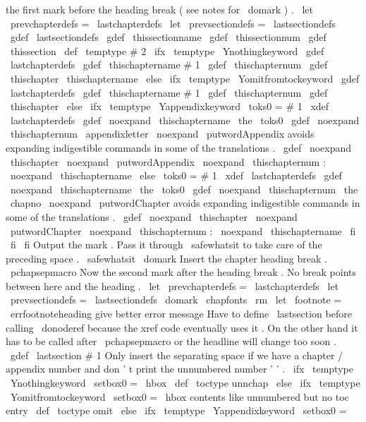 {{{{the
first
mark
before
the
heading
break
(
see
notes
for
\
domark
)
.
\
let
\
prevchapterdefs
=
\
lastchapterdefs
\
let
\
prevsectiondefs
=
\
lastsectiondefs
\
gdef
\
lastsectiondefs
{
\
gdef
\
thissectionname
{
}
\
gdef
\
thissectionnum
{
}
%
\
gdef
\
thissection
{
}
}
%
%
\
def
\
temptype
{
#
2
}
%
\
ifx
\
temptype
\
Ynothingkeyword
\
gdef
\
lastchapterdefs
{
\
gdef
\
thischaptername
{
#
1
}
\
gdef
\
thischapternum
{
}
%
\
gdef
\
thischapter
{
\
thischaptername
}
}
%
\
else
\
ifx
\
temptype
\
Yomitfromtockeyword
\
gdef
\
lastchapterdefs
{
\
gdef
\
thischaptername
{
#
1
}
\
gdef
\
thischapternum
{
}
%
\
gdef
\
thischapter
{
}
}
%
\
else
\
ifx
\
temptype
\
Yappendixkeyword
\
toks0
=
{
#
1
}
%
\
xdef
\
lastchapterdefs
{
%
\
gdef
\
noexpand
\
thischaptername
{
\
the
\
toks0
}
%
\
gdef
\
noexpand
\
thischapternum
{
\
appendixletter
}
%
%
\
noexpand
\
putwordAppendix
avoids
expanding
indigestible
%
commands
in
some
of
the
translations
.
\
gdef
\
noexpand
\
thischapter
{
\
noexpand
\
putwordAppendix
{
}
\
noexpand
\
thischapternum
:
\
noexpand
\
thischaptername
}
%
}
%
\
else
\
toks0
=
{
#
1
}
%
\
xdef
\
lastchapterdefs
{
%
\
gdef
\
noexpand
\
thischaptername
{
\
the
\
toks0
}
%
\
gdef
\
noexpand
\
thischapternum
{
\
the
\
chapno
}
%
%
\
noexpand
\
putwordChapter
avoids
expanding
indigestible
%
commands
in
some
of
the
translations
.
\
gdef
\
noexpand
\
thischapter
{
\
noexpand
\
putwordChapter
{
}
\
noexpand
\
thischapternum
:
\
noexpand
\
thischaptername
}
%
}
%
\
fi
\
fi
\
fi
%
%
Output
the
mark
.
Pass
it
through
\
safewhatsit
to
take
care
of
%
the
preceding
space
.
\
safewhatsit
\
domark
%
%
Insert
the
chapter
heading
break
.
\
pchapsepmacro
%
%
Now
the
second
mark
after
the
heading
break
.
No
break
points
%
between
here
and
the
heading
.
\
let
\
prevchapterdefs
=
\
lastchapterdefs
\
let
\
prevsectiondefs
=
\
lastsectiondefs
\
domark
%
{
%
\
chapfonts
\
rm
\
let
\
footnote
=
\
errfootnoteheading
%
give
better
error
message
%
%
Have
to
define
\
lastsection
before
calling
\
donoderef
because
the
%
xref
code
eventually
uses
it
.
On
the
other
hand
it
has
to
be
called
%
after
\
pchapsepmacro
or
the
headline
will
change
too
soon
.
\
gdef
\
lastsection
{
#
1
}
%
%
%
Only
insert
the
separating
space
if
we
have
a
chapter
/
appendix
%
number
and
don
'
t
print
the
unnumbered
number
'
'
.
\
ifx
\
temptype
\
Ynothingkeyword
\
setbox0
=
\
hbox
{
}
%
\
def
\
toctype
{
unnchap
}
%
\
else
\
ifx
\
temptype
\
Yomitfromtockeyword
\
setbox0
=
\
hbox
{
}
%
contents
like
unnumbered
but
no
toc
entry
\
def
\
toctype
{
omit
}
%
\
else
\
ifx
\
temptype
\
Yappendixkeyword
\
setbox0
=
}}}}}
